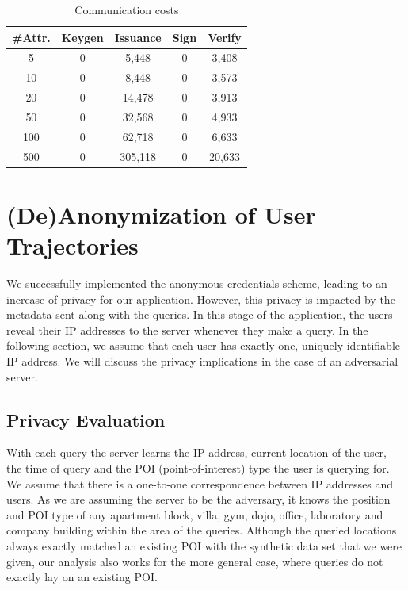 \documentclass[9pt,conference]{IEEEtran}
\begin{document}
\begin{table}
\caption{Communication costs}
\centering
\label{communication}
\begin{tabular}{ccccc}
\textbf{\#Attr.} & \textbf{Keygen} & \textbf{Issuance} & \textbf{Sign} & \textbf{Verify} \\ \hline
5                & 0               & 5,448             & 0             & 3,408           \\
10               & 0               & 8,448             & 0             & 3,573           \\
20               & 0               & 14,478            & 0             & 3,913           \\
50               & 0               & 32,568            & 0             & 4,933           \\
100              & 0               & 62,718            & 0             & 6,633           \\
500              & 0               & 305,118           & 0             & 20,633         
\end{tabular}
\end{table}

\section{(De)Anonymization of User Trajectories}
\label{sec:priv}

We successfully implemented the anonymous credentials scheme, leading to an increase of privacy for our application. However, this privacy is impacted by the metadata sent along with the queries. In this stage of the application, the users reveal their IP addresses to the server whenever they make a query. In the following section, we assume that each user has exactly one, uniquely identifiable IP address. We will discuss the privacy implications in the case of an adversarial server.

\subsection{Privacy Evaluation}
With each query the server learns the IP address, current location of the user, the time of query and the POI (point-of-interest) type the user is querying for. We assume that there is a one-to-one correspondence between IP addresses and users. As we are assuming the server to be the adversary, it knows the position and POI type of any apartment block, villa, gym, dojo, office, laboratory and company building within the area of the queries. Although the queried locations always exactly matched an existing POI with the synthetic data set that we were given, our analysis also works for the more general case, where queries do not exactly lay on an existing POI.
\end{document}

